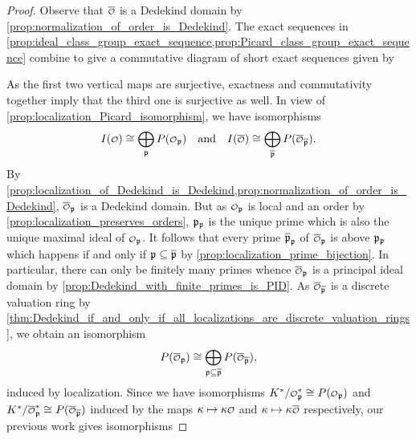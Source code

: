     \begin{proof}
      Observe that \(\conj{\smc{O}}\) is a Dedekind domain by \cref{prop:normalization_of_order_is_Dedekind}. The exact sequences in \cref{prop:ideal_class_group_exact_sequence,prop:Picard_class_group_exact_sequence} combine to give a commutative diagram of short exact sequences given by
      \begin{center}
      \end{center}
      As the first two vertical maps are surjective, exactness and commutativity together imply that the third one is surjective as well. In view of \cref{prop:localization_Picard_isomorphism}, we have isomorphisms
      \[
        I(\smc{O}) \cong \bigop_{\mf{p}}P(\smc{O}_{\mf{p}}) \quad \text{and} \quad I(\conj{\smc{O}}) \cong \bigop_{\conj{\mf{p}}}P(\conj{\smc{O}}_{\conj{\mf{p}}}).
      \]
      By \cref{prop:localization_of_Dedekind_is_Dedekind,prop:normalization_of_order_is_Dedekind}, \(\conj{\smc{O}}_{\mf{p}}\) is a Dedekind domain. But as \(\smc{O}_{\mf{p}}\) is local and an order by \cref{prop:localization_preserves_orders}, \(\mathfrak{p}_{\mathfrak{p}}\) is the unique prime which is also the unique maximal ideal of \(\smc{O}_{\mf{p}}\). It follows that every prime \(\overline{\mathfrak{p}}_{\mathfrak{p}}\) of \(\conj{\smc{O}}_{\mf{p}}\) is above \(\mathfrak{p}_{\mathfrak{p}}\) which happens if and only if \(\mathfrak{p} \subseteq \overline{\mathfrak{p}}\) by \cref{prop:localization_prime_bijection}. In particular, there can only be finitely many primes whence \(\conj{\smc{O}}_{\mf{p}}\) is a principal ideal domain by \cref{prop:Dedekind_with_finite_primes_is_PID}. As \(\conj{\smc{O}}_{\conj{\mf{p}}}\) is a discrete valuation ring by \cref{thm:Dedekind_if_and_only_if_all_localizations_are_discrete_valuation_rings}, we obtain an isomorphism
      \[
        P(\conj{\smc{O}}_{\mf{p}}) \cong \bigop_{\mf{p} \subseteq \conj{\mf{p}}}P(\conj{\smc{O}}_{\conj{\mf{p}}}),
      \]
      induced by localization. Since we have isomorphisms \(K^{\ast}/\smc{O}_{\mf{p}}^{\ast} \cong P(\smc{O}_{\mf{p}})\) and \(K^{\ast}/\conj{\smc{O}}_{\mf{p}}^{\ast} \cong P(\conj{\smc{O}}_{\conj{\mf{p}}})\) induced by the maps \(\k \mapsto \k\smc{O}\) and \(\k \mapsto \k\conj{\smc{O}}\) respectively, our previous work gives isomorphisms

\end{proof}
